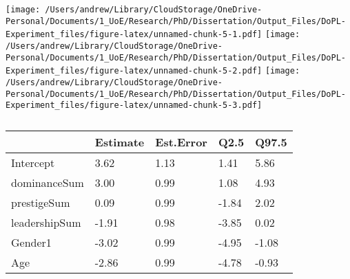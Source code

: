 \documentclass[
  donotrepeattitle,doc, 12pt, a4paper,floatsintext]{apa7}
\begin{document}
\texttt{[image: /Users/andrew/Library/CloudStorage/OneDrive-Personal/Documents/1\_UoE/Research/PhD/Dissertation/Output\_Files/DoPL-Experiment\_files/figure-latex/unnamed-chunk-5-1.pdf]} \texttt{[image: /Users/andrew/Library/CloudStorage/OneDrive-Personal/Documents/1\_UoE/Research/PhD/Dissertation/Output\_Files/DoPL-Experiment\_files/figure-latex/unnamed-chunk-5-2.pdf]} \texttt{[image: /Users/andrew/Library/CloudStorage/OneDrive-Personal/Documents/1\_UoE/Research/PhD/Dissertation/Output\_Files/DoPL-Experiment\_files/figure-latex/unnamed-chunk-5-3.pdf]}

\begin{table}[tbp]

\begin{center}
\begin{threeparttable}

\caption{\label{tab:unnamed-chunk-6}}

\begin{tabular}{lllll}
\toprule
 & \multicolumn{1}{c}{Estimate} & \multicolumn{1}{c}{Est.Error} & \multicolumn{1}{c}{Q2.5} & \multicolumn{1}{c}{Q97.5}\\
\midrule
Intercept & 3.62 & 1.13 & 1.41 & 5.86\\
dominanceSum & 3.00 & 0.99 & 1.08 & 4.93\\
prestigeSum & 0.09 & 0.99 & -1.84 & 2.02\\
leadershipSum & -1.91 & 0.98 & -3.85 & 0.02\\
Gender1 & -3.02 & 0.99 & -4.95 & -1.08\\
Age & -2.86 & 0.99 & -4.78 & -0.93\\
\bottomrule
\end{tabular}

\end{threeparttable}
\end{center}

\end{table}
\end{document}
